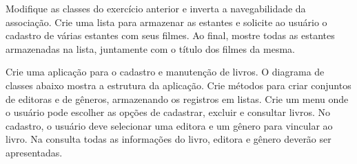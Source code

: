 \begin{exercise}[ListaFilmes]
Modifique as classes do exercício anterior e inverta a navegabilidade da associação. Crie uma lista para armazenar as estantes e solicite ao usuário o cadastro de várias estantes com seus filmes. Ao final, mostre todas as estantes armazenadas na lista, juntamente com o título dos filmes da mesma.
\end{exercise}

\begin{exercise}[Livros]
Crie uma aplicação para o cadastro e manutenção de livros. O diagrama de classes abaixo mostra a estrutura da aplicação. Crie métodos para criar conjuntos de editoras e de gêneros, armazenando os registros em listas. Crie um menu onde o usuário pode escolher as opções de cadastrar, excluir e consultar livros. No cadastro, o usuário deve selecionar uma editora e um gênero para vincular ao livro. Na consulta todas as informações do livro, editora e gênero deverão ser apresentadas.

\begin{figure}[h]
	\centering
\end{figure}
\end{exercise}

